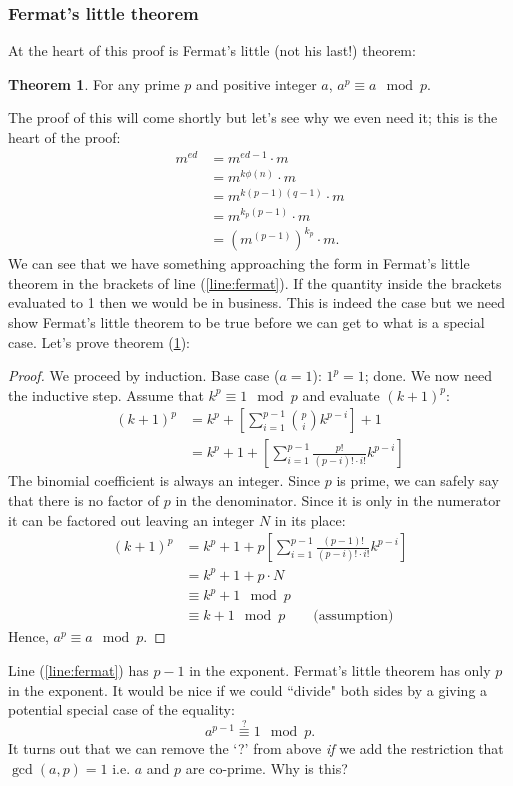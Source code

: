 \documentclass[]{scrartcl}
\theoremstyle{definition}
\newtheorem{thm}{Theorem}
\let\oldref\ref
\renewcommand{\ref}[1]{(\oldref{#1})}
\begin{document}
\subsubsection{Fermat's little theorem}
At the heart of this proof is Fermat's little (not his last!) theorem:
\begin{thm}\label{thm:fermat}
    For any prime $p$ and positive integer $a$, $a^p \equiv a \mod p$.
\end{thm}
The proof of this will come shortly but let's see why we even need it; this is the heart of the proof:
\begin{align}
m^{ed}&=m^{ed-1}\cdot m \\
      &=m^{k\phi(n)}\cdot m  \\
      &=m^{k(p-1)(q-1)}\cdot m  \\
      &=m^{k_p(p-1)}\cdot m  \\
      &=\left(m^{(p-1)}\right)^{k_p}\cdot m . \label{line:fermat}
\end{align}
We can see that we have something approaching the form in Fermat's little theorem in the brackets of line \ref{line:fermat}. If the quantity inside the brackets evaluated to 1 then we would be in business. This is indeed the case but we need show Fermat's little theorem to be true before we can get to what is a special case. Let's prove theorem \ref{thm:fermat}:
\begin{proof}
    We proceed by induction. Base case ($a=1$): $1^p = 1$; done. We now need the inductive step. Assume that $k^p \equiv 1 \mod p$ and evaluate $(k+1)^p$:
    \begin{align*}
        (k + 1)^p &=k^p + \left[\sum_{i=1}^{p-1} \binom{p}{i}k^{p-i}\right] + 1 \\
                  &=k^p + 1 + \left[\sum_{i=1}^{p-1} \frac{p!}{(p-i)!\cdot i!}k^{p-i}\right]
    \end{align*}
    The binomial coefficient is always an integer. Since $p$ is prime, we can safely say that there is no factor of $p$ in the denominator. Since it is only in the numerator it can be factored out leaving an integer $N$ in its place:
    \begin{align*}
        (k + 1)^p &=k^p + 1 + p\left[\sum_{i=1}^{p-1} \frac{(p-1)!}{(p-i)!\cdot i!}k^{p-i}\right] \\
                  &=k^p + 1 + p \cdot N \\
                  &\equiv k^p + 1 \mod p \\
                  &\equiv k + 1 \mod p\qquad \textrm{(assumption)}
    \end{align*}
    Hence, $a^p \equiv a \mod p$.
\end{proof}
Line \ref{line:fermat} has $p-1$ in the exponent. Fermat's little theorem has only $p$ in the exponent. It would be nice if we could ``divide" both sides by a giving a potential special case of the equality:
\begin{equation}\label{eqn:fermat-special}
    a^{p-1} \overset{?}{\equiv} 1 \mod p.
\end{equation}
It turns out that we can remove the `?' from above \textit{if} we add the restriction that $\gcd(a, p) = 1$ i.e. $a$ and $p$ are co-prime. Why is this?
\end{document}
